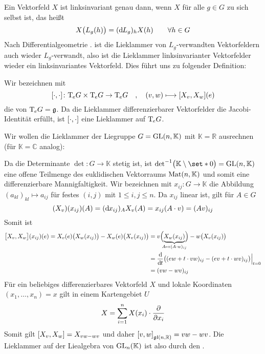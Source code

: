 Ein Vektorfeld $X$ ist linksinvariant genau dann, wenn $X$ für alle $g \in G$  zu sich selbst ist, das heißt
\[
	X \enbrace[\big]{L_g(h)} = (\mathd L_g)_h X(h) \qquad  \forall h \in G
\]
Nach Differentialgeometrie . ist die Lieklammer von $L_g$-verwandten Vektorfeldern auch wieder $L_g$-verwandt, also ist die Lieklammer linksinvarianter Vektorfelder wieder ein linksinvariantes Vektorfeld.
Dies führt uns zu folgender Definition:

\begin{definition}[{name=[Liealgebra einer Liegruppe]}]
	Wir bezeichnen mit
	\[
		\benbrace*{\cdot ,\cdot } \colon \Tmap_e G \times \Tmap_e G \to \Tmap_e G \quad ,\quad  (v,w) \longmapsto \benbrace*{X_v,X_w}(e)
	\] 
	die  von $\Tmap_e G = \mathfrak{g}$.
	Da die Lieklammer differenzierbarer Vektorfelder die Jacobi-Identität erfüllt, ist $\benbrace*{\cdot ,\cdot }$ eine Lieklammer auf $\Tmap_e G$.
\end{definition}

\begin{beispiel*}[{name=[{Lieklammer für allgemeine lineare Gruppe}]}]
	Wir wollen die Lieklammer der Liegruppe $G=\GL(n,\mathbb{K})$ mit $\mathbb{K}=\mathbb{R}$ ausrechnen (für $\mathbb{K}=\mathbb{C}$ analog):
	
	Da die Determinante $\det \colon G \to \mathbb{K}$ stetig ist, ist 
	\(
		{\det}^{-1} \enbrace[\big]{\mathbb{K}\setminus \set*{0}} = \GL(n,\mathbb{K}) 
	\)
	eine offene Teilmenge des euklidischen Vektorraums $\Mat(n,\mathbb{K})$ und somit eine differenzierbare Mannigfaltigkeit.
	Wir bezeichnen mit $x_{ij} \colon G \to \mathbb{K}$ die Abbildung $(a_{kl})_{kl} \mapsto a_{ij}$ für festes $(i,j)$ mit $1\le i,j\le n$.
	Da $x_{ij}$ linear ist, gilt für $A \in G$
	\[
		(X_v)(x_{ij})(A) = (\mathd x_{ij})_A X_v(A) = x_{ij}(A \cdot v) = (A v)_{ij}
	\]
	Somit ist
	\begin{align}
		\benbrace[\big]{X_v,X_w}(x_{ij})(e) = X_v(e) \enbrace[\big]{X_w(x_{ij})} - X_w(e) \enbrace[\big]{X_v(x_{ij})} &= v \enbrace[\Big]{\Underbrace{X_w(x_{ij})}{\mathclap{A \mapsto (A \cdot w)_{ij}}}} - w \enbrace[\big]{X_v(x_{ij})} \\
		&= \diffd{}{t} \enbrace[\big]{(ew + t \cdot vw)_{ij} - (ev + t \cdot wv)_{ij}} \Big|_{t=0} \\
		&= (v w- w v)_{ij}
	\end{align}
	Für ein beliebiges differenzierbares Vektorfeld $X$ und lokale Koordinaten $(x_1, \ldots ,x_n)=x$ gilt in einem Kartengebiet $U$
	\[
		X = \sum_{i=1}^{n} X(x_i) \cdot \diff{}{x_i}
	\]
	Somit gilt $\benbrace*{X_v,X_w} =X_{vw -wv}$ und daher $\benbrace*{v,w}_{\mathfrak{gl}(n,\mathbb{R})}=vw -wv$.
	Die Lieklammer auf der Liealgebra von $\GL_n(\mathbb{K})$ ist also durch den .
\end{beispiel*}

